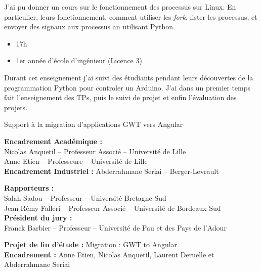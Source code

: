 \documentclass[10pt,a4paper,ragged2e,withhyper]{altacv}
\begin{document}
J'ai pu donner un cours sur le fonctionnement des processus sur Linux.
En particulier, leurs fonctionnement, comment utiliser les \textit{fork}, lister les processus, et envoyer des signaux aux processus an utilisant Python.

\divider

\begin{itemize}
  \item \faClock 17h
  \item 1er année d'école d'ingénieur (Licence 3)
\end{itemize}

Durant cet enseignement j'ai suivi des étudiants pendant leurs découvertes de la programmation Python pour controler un Arduino.
J'ai dans un premier temps fait l'enseignement des TPs, puis le suivi de projet et enfin l'évaluation des projets.

\medskip


Support à la migration d'applications GWT vers Angular

\textbf{Encadrement Académique :}\\
Nicolas Anquetil -- Professeur Associé -- Université de Lille\\
Anne Etien -- Professeure -- Université de Lille\\
\textbf{Encadrement Industriel :} Abderrahmane Seriai -- Berger-Levrault


\textbf{Rapporteurs :}\\
Salah Sadou -- Professeur -- Université Bretagne Sud\\
Jean-Rémy Falleri -- Professeur Associé -- Université de Bordeaux Sud\\

\textbf{Président du jury :}\\
Franck Barbier -- Professeur -- Université de Pau et des Pays de l’Adour


\divider


\textbf{Projet de fin d'étude :} Migration : GWT to Angular\\
\textbf{Encadrement :} Anne Etien, Nicolas Anquetil, Laurent Deruelle et Abderrahmane Seriai
\end{document}
